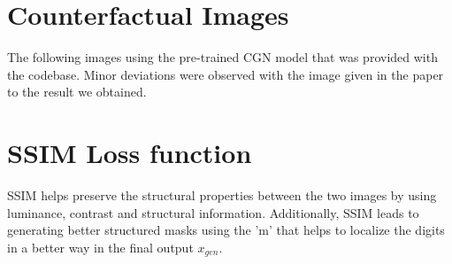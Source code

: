 \begin{appendices}
\section{Counterfactual Images}
The following images using the pre-trained CGN model that was provided with the codebase. Minor deviations were observed with the image given in the paper to the result we obtained. 




\newpage
\section{SSIM Loss function}
SSIM \cite{wang2004image} helps preserve the structural properties between the two images by using luminance, contrast and structural information. Additionally, SSIM \cite{wang2004image} leads to generating better structured masks using the 'm' that helps to localize the digits in a better way in the final output $x_{gen}$.


\end{appendices}

